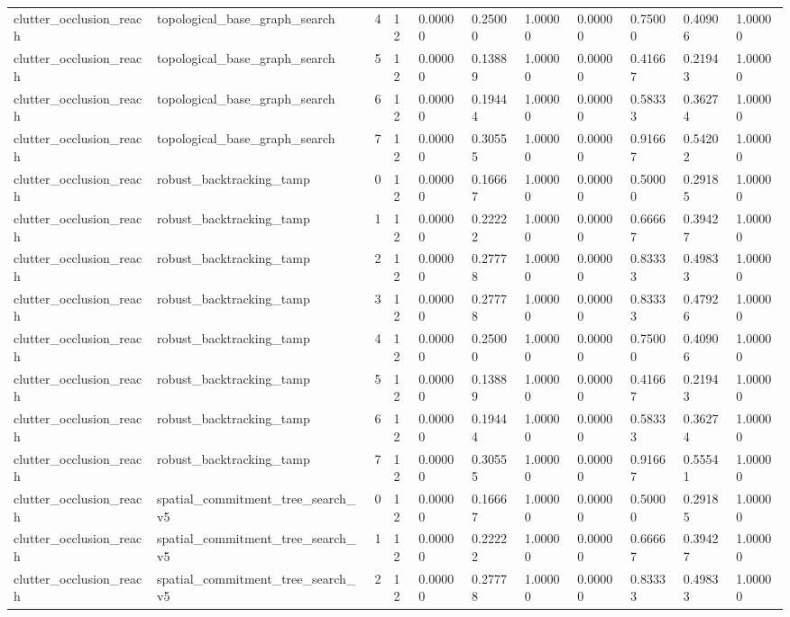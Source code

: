 \documentclass{article}
\begin{document}
\begin{table}[tbp]
{\begin{tabular}{lllllllllll}
clutter\_occlusion\_reach & topological\_base\_graph\_search & 4 & 12 & 0.00000 & 0.25000 & 1.00000 & 0.00000 & 0.75000 & 0.40906 & 1.00000 \\
clutter\_occlusion\_reach & topological\_base\_graph\_search & 5 & 12 & 0.00000 & 0.13889 & 1.00000 & 0.00000 & 0.41667 & 0.21943 & 1.00000 \\
clutter\_occlusion\_reach & topological\_base\_graph\_search & 6 & 12 & 0.00000 & 0.19444 & 1.00000 & 0.00000 & 0.58333 & 0.36274 & 1.00000 \\
clutter\_occlusion\_reach & topological\_base\_graph\_search & 7 & 12 & 0.00000 & 0.30555 & 1.00000 & 0.00000 & 0.91667 & 0.54202 & 1.00000 \\
clutter\_occlusion\_reach & robust\_backtracking\_tamp & 0 & 12 & 0.00000 & 0.16667 & 1.00000 & 0.00000 & 0.50000 & 0.29185 & 1.00000 \\
clutter\_occlusion\_reach & robust\_backtracking\_tamp & 1 & 12 & 0.00000 & 0.22222 & 1.00000 & 0.00000 & 0.66667 & 0.39427 & 1.00000 \\
clutter\_occlusion\_reach & robust\_backtracking\_tamp & 2 & 12 & 0.00000 & 0.27778 & 1.00000 & 0.00000 & 0.83333 & 0.49833 & 1.00000 \\
clutter\_occlusion\_reach & robust\_backtracking\_tamp & 3 & 12 & 0.00000 & 0.27778 & 1.00000 & 0.00000 & 0.83333 & 0.47926 & 1.00000 \\
clutter\_occlusion\_reach & robust\_backtracking\_tamp & 4 & 12 & 0.00000 & 0.25000 & 1.00000 & 0.00000 & 0.75000 & 0.40906 & 1.00000 \\
clutter\_occlusion\_reach & robust\_backtracking\_tamp & 5 & 12 & 0.00000 & 0.13889 & 1.00000 & 0.00000 & 0.41667 & 0.21943 & 1.00000 \\
clutter\_occlusion\_reach & robust\_backtracking\_tamp & 6 & 12 & 0.00000 & 0.19444 & 1.00000 & 0.00000 & 0.58333 & 0.36274 & 1.00000 \\
clutter\_occlusion\_reach & robust\_backtracking\_tamp & 7 & 12 & 0.00000 & 0.30555 & 1.00000 & 0.00000 & 0.91667 & 0.55541 & 1.00000 \\
clutter\_occlusion\_reach & spatial\_commitment\_tree\_search\_v5 & 0 & 12 & 0.00000 & 0.16667 & 1.00000 & 0.00000 & 0.50000 & 0.29185 & 1.00000 \\
clutter\_occlusion\_reach & spatial\_commitment\_tree\_search\_v5 & 1 & 12 & 0.00000 & 0.22222 & 1.00000 & 0.00000 & 0.66667 & 0.39427 & 1.00000 \\
clutter\_occlusion\_reach & spatial\_commitment\_tree\_search\_v5 & 2 & 12 & 0.00000 & 0.27778 & 1.00000 & 0.00000 & 0.83333 & 0.49833 & 1.00000 \\

\end{tabular}}
\end{table}
\end{document}
